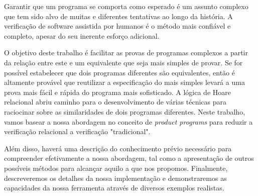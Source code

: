 
%

Garantir que um programa se comporta como esperado é um assunto complexo que tem sido alvo de muitas e diferentes tentativas ao longo da história.
A verificação de software assistida por humanos é o método mais confiável e completo, apesar do seu inerente esforço adicional.

O objetivo deste trabalho é facilitar as provas de programas complexos a partir da relação entre este e um equivalente que seja mais simples de provar.
Se for possível estabelecer que dois programas diferentes são equivalentes, então é altamente provável que reutilizar a especificação do mais simples levará a uma prova mais fácil e rápida do programa mais sofisticado.
A lógica de Hoare relacional abriu caminho para o desenvolvimento de várias técnicas para raciocinar sobre as similaridades de dois programas diferentes.
Neste trabalho, vamos basear a nossa abordagem no conceito de \emph{product programs} para reduzir a verificação relacional a verificação "tradicional".

Além disso, haverá uma descrição do conhecimento prévio necessário para compreender efetivamente a nossa abordagem, tal como a apresentação de outros possíveis métodos para alcançar aquilo a que nos propomos.
Finalmente, descreveremos os detalhes da nossa implementação e demonstraremos as capacidades da nossa ferramenta através de diversos exemplos realistas.

